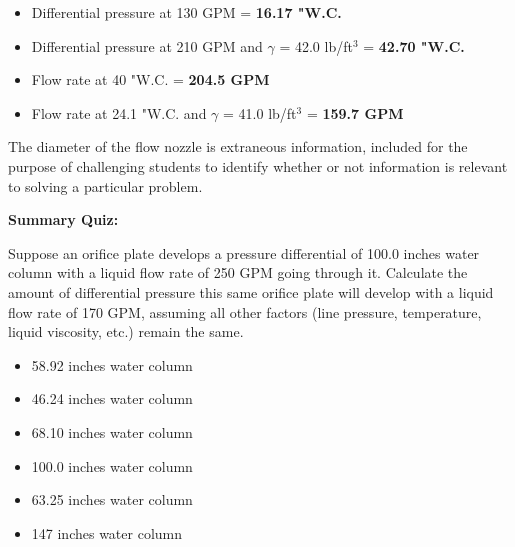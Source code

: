 \begin{itemize}
\item{} Differential pressure at 130 GPM = {\bf 16.17 "W.C.}
\item{} Differential pressure at 210 GPM and $\gamma$ = 42.0 lb/ft$^{3}$ = {\bf 42.70 "W.C.}  
\item{} Flow rate at 40 "W.C. = {\bf 204.5 GPM} 
\item{} Flow rate at 24.1 "W.C. and $\gamma$ = 41.0 lb/ft$^{3}$ = {\bf 159.7 GPM}
\end{itemize}

\vskip 10pt

The diameter of the flow nozzle is extraneous information, included for the purpose of challenging students to identify whether or not information is relevant to solving a particular problem.










\vfil \eject

\noindent
{\bf Summary Quiz:}

Suppose an orifice plate develops a pressure differential of 100.0 inches water column with a liquid flow rate of 250 GPM going through it.  Calculate the amount of differential pressure this same orifice plate will develop with a liquid flow rate of 170 GPM, assuming all other factors (line pressure, temperature, liquid viscosity, etc.) remain the same.

\begin{itemize}
\item{} 58.92 inches water column 
\vskip 5pt 
\item{} 46.24 inches water column
\vskip 5pt 
\item{} 68.10 inches water column 
\vskip 5pt 
\item{} 100.0 inches water column
\vskip 5pt 
\item{} 63.25 inches water column 
\vskip 5pt 
\item{} 147 inches water column 
\end{itemize}




